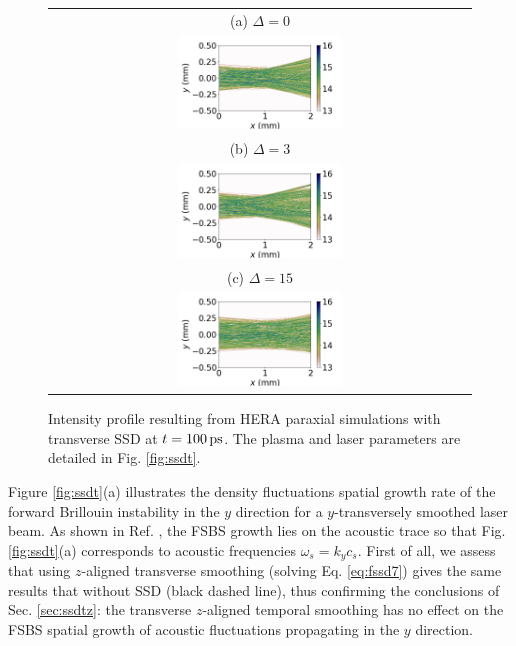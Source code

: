 \documentclass[
 reprint,
 amsmath,amssymb,
 aps,
]{revtex4-1}
\begin{document}
\begin{figure}
\begin{tabular}{c}
(a) $\Delta=0$\\
\includegraphics[width=0.4\textwidth,trim={2cm 0 0 0},clip]{ISSD0_t100ps.png}\\
(b)  $\Delta=3$\\
\includegraphics[width=0.4\textwidth,trim={2cm 0 0 0},clip]{ISSD1_t100ps.png}\\
(c) $\Delta=15$\\
\includegraphics[width=0.4\textwidth,trim={2cm 0 0 0},clip]{ISSD5_t100ps.png}
\end{tabular}
\caption{ \label{fig:ssdt_I} 
  Intensity profile resulting from HERA paraxial simulations with transverse SSD at $t=100\,\rm ps$. The plasma and laser parameters are detailed in Fig. \ref{fig:ssdt}.
}
\end{figure}
Figure \ref{fig:ssdt}(a) illustrates the density fluctuations spatial growth rate of the forward Brillouin instability in the $y$ direction  for a $y$-transversely smoothed laser beam. As shown in Ref. \cite[]{POP_Ruyer_2021}, the FSBS growth lies on the acoustic trace so that Fig.  \ref{fig:ssdt}(a) corresponds to acoustic frequencies $\omega_s=k_yc_s$.   First of all, we assess that using $z$-aligned transverse smoothing (solving Eq. \eqref{eq:fssd7}) gives the same results that without SSD (black dashed line), thus confirming the conclusions of Sec. \ref{sec:ssdtz}: the transverse $z$-aligned temporal smoothing has no effect on the  FSBS spatial growth of acoustic fluctuations propagating in the $y$ direction. 
\end{document}
